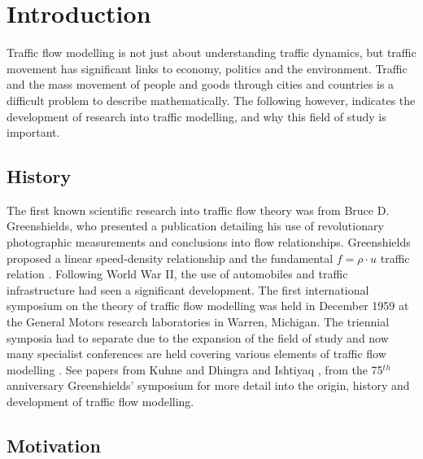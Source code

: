 \chapter{Introduction}
\label{ch:intro}
\graphicspath{{image_directory/introduction/}}

Traffic flow modelling is not just about understanding traffic dynamics, but traffic movement has significant links to economy, politics and the environment. Traffic and the mass movement of people and goods through cities and countries is a difficult problem to describe mathematically. The following however, indicates the development of research into traffic modelling, and why this field of study is important.

\section{History}
\label{sec:history}

	The first known scientific research into traffic flow theory was from Bruce D. Greenshields, who presented a publication \cite{Greenshields35} detailing his use of revolutionary photographic measurements and conclusions into flow relationships. Greenshields proposed a linear speed-density relationship and the fundamental $f=\rho\cdot u$ traffic relation \cite{Kuhne11}. Following World War II, the use of automobiles and traffic infrastructure had seen a significant development. The first international symposium on the theory of traffic flow modelling was held in December 1959 at the General Motors research laboratories in Warren, Michigan. The triennial symposia had to separate due to the expansion of the field of study and now many specialist conferences are held covering various elements of traffic flow modelling \cite{Dhingra11}. See papers from Kuhne \cite{Kuhne11} and Dhingra and Ishtiyaq \cite{Dhingra11}, from the 75$^{th}$ anniversary Greenshields' symposium for more detail into the origin, history and development of traffic flow modelling.  


\section{Motivation}
\label{sec:motivation}

